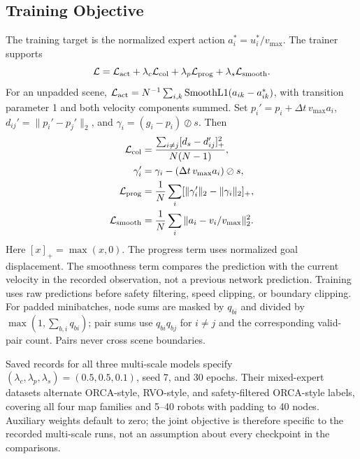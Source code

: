 \documentclass[conference]{IEEEtran}
\begin{document}
\subsection{Training Objective}
The training target is the normalized expert action $a_i^*=u_i^*/v_{\max}$.
The trainer supports
\begin{equation}
\mathcal L=\mathcal L_{\rm act}+\lambda_c\mathcal L_{\rm col}
+\lambda_p\mathcal L_{\rm prog}+\lambda_s\mathcal L_{\rm smooth}.
\end{equation}
For an unpadded scene, $\mathcal L_{\rm act}=N^{-1}\sum_{i,k}
\operatorname{SmoothL1}(a_{ik}-a_{ik}^*)$, with transition parameter 1 and
both velocity components summed. Set $p_i'=p_i+\Delta t\,v_{\max}a_i$,
$d_{ij}'=\|p_i'-p_j'\|_2$, and $\gamma_i=(g_i-p_i)\oslash s$. Then
\begin{equation}
\begin{aligned}
\mathcal L_{\rm col}&=\frac{\sum_{i\ne j}[d_s-d_{ij}']_+^2}{N(N-1)},\\
\gamma_i'&=\gamma_i-(\Delta t\,v_{\max}a_i)\oslash s,\\
\mathcal L_{\rm prog}&=\frac1N\sum_i[\|\gamma_i'\|_2-\|\gamma_i\|_2]_+,\\
\mathcal L_{\rm smooth}&=\frac1N\sum_i\|a_i-v_i/v_{\max}\|_2^2.
\end{aligned}
\end{equation}
Here $[x]_+=\max(x,0)$. The progress term uses normalized goal displacement.
The smoothness term compares the prediction with the current velocity in
the recorded observation, not a previous network prediction. Training uses
raw predictions before safety filtering, speed clipping, or boundary clipping.
For padded minibatches, node sums are masked by $q_{bi}$ and divided by
$\max(1,\sum_{b,i}q_{bi})$; pair sums use $q_{bi}q_{bj}$ for $i\ne j$ and
the corresponding valid-pair count. Pairs never cross scene boundaries.

Saved records for all three multi-scale models specify
$(\lambda_c,\lambda_p,\lambda_s)=(0.5,0.5,0.1)$, seed 7, and 30 epochs.
Their mixed-expert datasets alternate ORCA-style, RVO-style, and
safety-filtered ORCA-style labels, covering all four map families and
5--40 robots with padding to 40 nodes. Auxiliary weights default to zero;
the joint objective is therefore specific to the recorded multi-scale runs,
not an assumption about every checkpoint in the comparisons.
\end{document}
